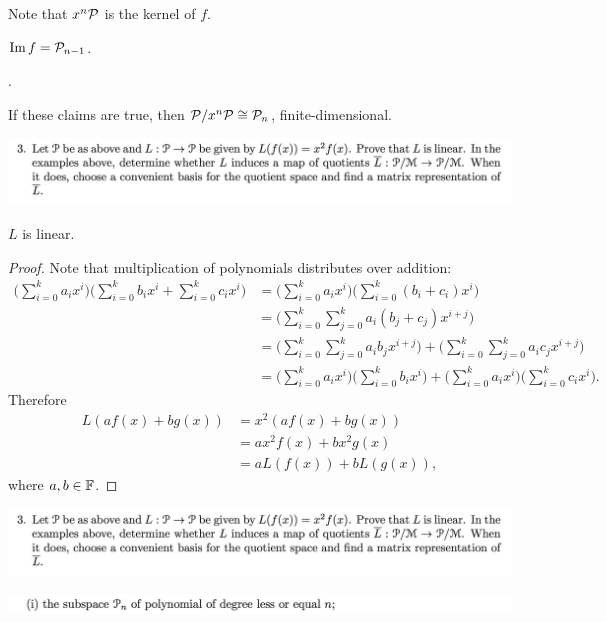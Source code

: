 \documentclass[12pt]{article}
\begin{document}
Note that $x^n\mathcal P$ is the kernel of $f$.

\begin{claim*}
  $\operatorname{\mathrm{Im}} f = \mathcal P_{n-1}$.
\end{claim*}

.

If these claims are true, then $\mathcal P/x^n\mathcal P \cong \mathcal P_n$, finite-dimensional.

\begin{mdframed}
\includegraphics[width=400pt]{img/linear-algebra-a0-2-3.png}
\end{mdframed}

\begin{claim*}
  $L$ is linear.
\end{claim*}

\begin{proof} Note that multiplication of polynomials distributes over addition:
  \begin{align*}
    \Big(\sum_{i=0}^k a_ix^i\Big)\Big(\sum_{i=0}^k b_ix^i + \sum_{i=0}^k c_ix^i\Big)
    &= \Big(\sum_{i=0}^k a_ix^i\Big)\Big(\sum_{i=0}^k (b_i + c_i)x^i\Big)\\
    &= \Big(\sum_{i=0}^{k}\sum_{j=0}^k a_i(b_j + c_j)x^{i+j}\Big)\\
    &= \Big(\sum_{i=0}^{k}\sum_{j=0}^k a_ib_jx^{i+j}\Big) +
       \Big(\sum_{i=0}^{k}\sum_{j=0}^k a_ic_jx^{i+j}\Big)\\
    &= \Big(\sum_{i=0}^k a_ix^i\Big)\Big(\sum_{i=0}^k b_ix^i\Big) +
       \Big(\sum_{i=0}^k a_ix^i\Big)\Big(\sum_{i=0}^k c_ix^i\Big).
  \end{align*}
  Therefore
  \begin{align*}
    L(af(x) + bg(x)) &= x^2(af(x) + bg(x))\\
                     &= ax^2f(x) + bx^2g(x)\\
                     &= aL(f(x)) + bL(g(x)),
  \end{align*}
  where $a, b \in \mathbb{F}$.
\end{proof}

\newpage
\begin{mdframed}
\includegraphics[width=400pt]{img/linear-algebra-a0-2-3.png}
\end{mdframed}
\begin{mdframed}
  \includegraphics[width=400pt]{img/linear-algebra-a0-2-2-1.png}
\end{mdframed}
\end{document}
